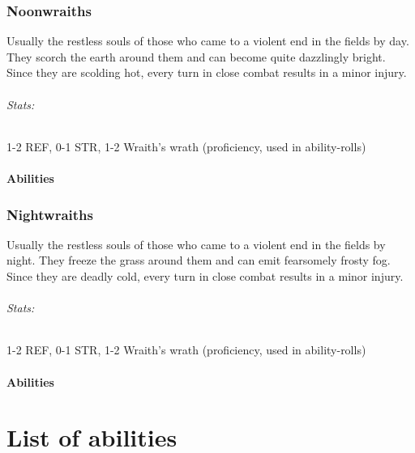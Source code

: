 \documentclass[parskip=full,11pt]{scrreport}
\begin{document}
\subsection{Noonwraiths}
Usually the restless souls of those who came to a violent end in the fields by day. They scorch the earth around them
and can become quite dazzlingly bright. Since they are scolding hot, every turn in close combat results in a minor injury.

\subparagraph{Stats:}
1-2 REF, 0-1 STR, 1-2 Wraith's wrath (proficiency, used in ability-rolls)

\subsubsection{Abilities}


\subsection{Nightwraiths}
Usually the restless souls of those who came to a violent end in the fields by night. They freeze the grass around them
and can emit fearsomely frosty fog. Since they are deadly cold, every turn in close combat results in a minor injury.

\subparagraph{Stats:}
1-2 REF, 0-1 STR, 1-2 Wraith's wrath (proficiency, used in ability-rolls)

\subsubsection{Abilities}


\chapter{List of abilities}

\abilitylist
\end{document}
